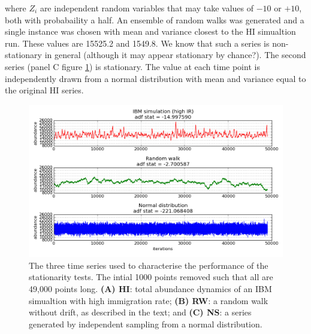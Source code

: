 where $Z_i$ are independent random variables that may take values of $-10$ or $+10$, both with probabaility a half. An ensemble of random walks was generated and a single instance was chosen with mean and variance closest to the HI simualtion run. These values are 15525.2 and 1549.8. We know that such a series is non-stationary in general (although it may appear stationary by chance?). The second series (panel C figure \ref{fig:adf}) is stationary. The value at each time point is independently drawn from a normal distribution with mean and variance equal to the original HI series.  


\begin{figure}[hb]
	\centering
	\includegraphics[width=0.8\linewidth]{"./chapters/chapter04/figures/steadystate/hi_rw_ns_dynamics"}
     \caption{The three time series used to characterise the performance of the stationarity tests. The intial 1000 points removed such that all are 49,000 points long. \textbf{(A) HI}: total abundance dynamics of an IBM simualtion with high immigration rate; \textbf{(B) RW}: a random walk without drift, as described in the text; and \textbf{(C) NS}: a series generated by independent sampling from a normal distribution.} 
     \label{fig:adf}   
\end{figure}

